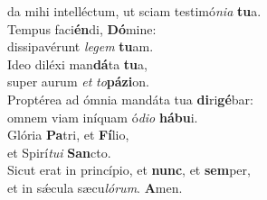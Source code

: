 \oddverse da mihi intelléctum, ut sciam testimó\textit{ni}\textit{a} \textbf{tu}a.\\
\evenverse Tempus faci\textbf{én}di, \textbf{Dó}mine:~\*\\
\evenverse dissipavérunt \textit{le}\textit{gem} \textbf{tu}am.\\
\oddverse Ideo diléxi man\textbf{dá}ta \textbf{tu}a,~\*\\
\oddverse super aurum \textit{et} \textit{to}\textbf{pá}\textbf{zi}on.\\
\evenverse Proptérea ad ómnia mandáta tua \textbf{di}ri\textbf{gé}bar:~\*\\
\evenverse omnem viam iníquam ó\textit{di}\textit{o} \textbf{há}\textbf{bu}i.\\
\oddverse Glória \textbf{Pa}tri, et \textbf{Fí}lio,~\*\\
\oddverse et Spirí\textit{tu}\textit{i} \textbf{San}cto.\\
\evenverse Sicut erat in princípio, et \textbf{nunc}, et \textbf{sem}per,~\*\\
\evenverse et in sǽcula sæcu\textit{ló}\textit{rum}. \textbf{A}men.\\
